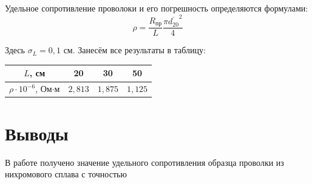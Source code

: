 Удельное сопротивление проволоки и его погрешность определяются формулами:
\[\rho = \frac{R_{\text{пр}}}{L} \frac{\pi \overline{d_{20}}^2}{4}\]

Здесь $\sigma_{L} = 0,1$ см.
Занесём все результаты в таблицу:
\begin{center}
\begin{tabular}{|c|c|c|c|}
\hline 
$L$, см & 20 & 30 & 50 \\ 
\hline 
$\rho \cdot 10^{-6}$, Ом$\cdot$м & $2,813$ & $1,875$ & $1,125$ \\ 
\end{tabular} 
\end{center}

\section{Выводы}

В работе получено значение удельного сопротивления образца проволки из нихромового сплава с точностью 


